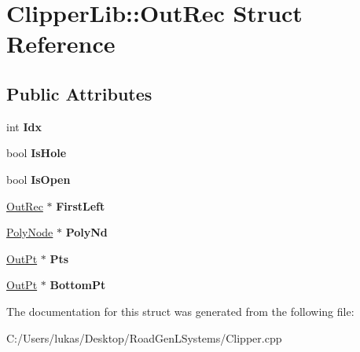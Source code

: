 \hypertarget{struct_clipper_lib_1_1_out_rec}{}\section{Clipper\+Lib\+:\+:Out\+Rec Struct Reference}
\label{struct_clipper_lib_1_1_out_rec}
\subsection*{Public Attributes}
\begin{DoxyCompactItemize}
\item 
\hypertarget{struct_clipper_lib_1_1_out_rec_ae2c437dec114034a456a7238ab6d8055}{}\label{struct_clipper_lib_1_1_out_rec_ae2c437dec114034a456a7238ab6d8055} 
int {\bfseries Idx}
\item 
\hypertarget{struct_clipper_lib_1_1_out_rec_a18b2b534b717139528047ba10a1c805c}{}\label{struct_clipper_lib_1_1_out_rec_a18b2b534b717139528047ba10a1c805c} 
bool {\bfseries Is\+Hole}
\item 
\hypertarget{struct_clipper_lib_1_1_out_rec_a065731c084453a818939c219868a2fcc}{}\label{struct_clipper_lib_1_1_out_rec_a065731c084453a818939c219868a2fcc} 
bool {\bfseries Is\+Open}
\item 
\hypertarget{struct_clipper_lib_1_1_out_rec_aa8baa934f1a7687a16b88a579dec3dd4}{}\label{struct_clipper_lib_1_1_out_rec_aa8baa934f1a7687a16b88a579dec3dd4} 
\hyperlink{struct_clipper_lib_1_1_out_rec}{Out\+Rec} $\ast$ {\bfseries First\+Left}
\item 
\hypertarget{struct_clipper_lib_1_1_out_rec_a334af720a9e0a815ba690e80e32bebd1}{}\label{struct_clipper_lib_1_1_out_rec_a334af720a9e0a815ba690e80e32bebd1} 
\hyperlink{class_clipper_lib_1_1_poly_node}{Poly\+Node} $\ast$ {\bfseries Poly\+Nd}
\item 
\hypertarget{struct_clipper_lib_1_1_out_rec_a82e9cba88d46d0d60db0b0365c6bd02e}{}\label{struct_clipper_lib_1_1_out_rec_a82e9cba88d46d0d60db0b0365c6bd02e} 
\hyperlink{struct_clipper_lib_1_1_out_pt}{Out\+Pt} $\ast$ {\bfseries Pts}
\item 
\hypertarget{struct_clipper_lib_1_1_out_rec_adc4d612df109de83dca298204176ff0c}{}\label{struct_clipper_lib_1_1_out_rec_adc4d612df109de83dca298204176ff0c} 
\hyperlink{struct_clipper_lib_1_1_out_pt}{Out\+Pt} $\ast$ {\bfseries Bottom\+Pt}
\end{DoxyCompactItemize}


The documentation for this struct was generated from the following file\+:\begin{DoxyCompactItemize}
\item 
C\+:/\+Users/lukas/\+Desktop/\+Road\+Gen\+L\+Systems/Clipper.\+cpp\end{DoxyCompactItemize}
